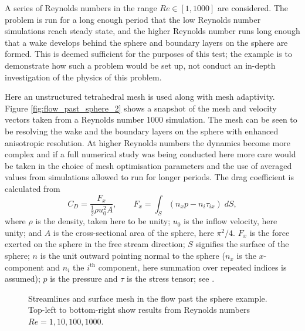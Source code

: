 A series of Reynolds numbers in the range
$Re\in [1,1000]$ are considered. The problem is run for a long enough
period that the low Reynolds number simulations reach steady state, and the
higher Reynolds number runs long enough that a wake develops behind the
sphere and boundary layers on the sphere are formed.  This is deemed
sufficient for the purposes of this test; the example is to demonstrate
how such a problem would be set up, not conduct an in-depth 
investigation of the physics of this problem.

Here an unstructured
tetrahedral mesh is used along with mesh adaptivity. 
Figure \ref{fig:flow_past_sphere_2} shows a snapshot of the
mesh and velocity vectors taken from a Reynolds number 1000 simulation. The
mesh can be seen to be resolving the wake and the boundary layers on the
sphere with enhanced anisotropic resolution. At higher Reynolds numbers the
dynamics become more complex and if a full numerical study was being
conducted here more care would be taken in the choice of mesh optimisation
parameters and the use of averaged values from simulations allowed to run
for longer periods. The drag coefficient is calculated from
\begin{equation}
C_D = \frac{F_x}{\frac{1}{2}\rho u_0^2 A},\qquad F_x = \int_S (n_xp - n_i\tau_{ix})\;dS,
\label{eqn:drag_coeff}
\end{equation}
where $\rho$ is the density, taken here to be unity; 
$u_0$ is the inflow velocity, here unity; 
and $A$ is the cross-sectional area of the sphere, here $\pi^2/4$. 
$F_x$ is the force 
exerted on the sphere in the free stream direction;
$S$ signifies the surface of the sphere; $n$ is the 
unit outward pointing normal to the sphere 
($n_x$ is the $x$-component and $n_i$ the $i^{\textrm{th}}$ 
component, here summation over repeated indices is assumed); 
$p$ is the pressure and $\tau$ is the stress tensor;
see \citet{panton2006}.

\begin{figure}
\centering
{}
\caption{Streamlines and surface mesh in the flow past the sphere example. Top-left to bottom-right
show results from Reynolds numbers $Re=1,10,100,1000$.}
\label{fig:flow_past_sphere_1}
\end{figure}



